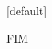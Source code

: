 \documentclass{beamer}
\begin{document}
[default]



\begin{frame}
    \centering
    \Large
    FIM
\end{frame}
    
\end{document}

